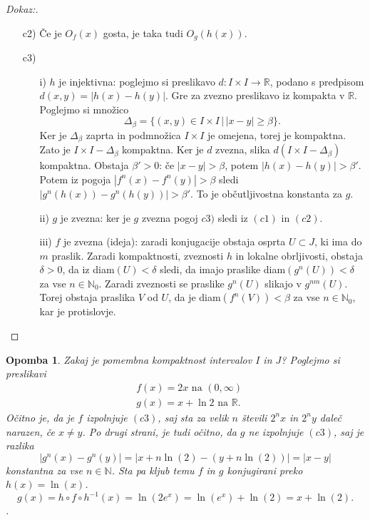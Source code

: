 \documentclass{article}
\newtheorem{opomba}{Opomba}
\newcommand{\N}{\mathbb{N}}
\newcommand{\R}{\mathbb{R}}
\begin{document}
\begin{proof}[Dokaz:]
\begin{enumerate}
\begin{center}
\begin{tikzpicture}
        \end{tikzpicture}
     \end{center}
\item[c2)] Če je $O_f(x)$ gosta, je taka tudi $O_g(h(x))$.
\item[c3)] 
\begin{enumerate}
    \item[i)] $h$ je injektivna: 
poglejmo si preslikavo $d: I\times I \rightarrow \R$, podano s predpisom $d(x, y) = |h(x) - h(y)|$. 
Gre za zvezno preslikavo iz kompakta v $\R$. Poglejmo si množico
$$
\Delta_\beta = \{(x, y)\in I\times I \,|\, |x-y| \geq \beta\}.
$$
Ker je $\Delta_\beta$ zaprta in podmnožica $I\times I$ je omejena, torej je kompaktna.
Zato je $I\times I - \Delta_\beta$ kompaktna. Ker je $d$ zvezna, slika $d(I\times I - \Delta_\beta)$
kompaktna. Obstaja $\beta' > 0$: če $|x - y|> \beta$, potem $|h(x) - h(y)| > \beta'$.
Potem iz pogoja $|f^n(x) - f^n(y)| > \beta$ sledi $|g^n(h(x)) - g^n(h(y))| > \beta'$. To je občutljivostna konstanta za $g$.
\item[ii)] $g$ je zvezna: ker je $g$ zvezna pogoj $c3)$ sledi iz $(c1)$ in $(c2)$.
\item[iii)] $f$ je zvezna (ideja): zaradi konjugacije obstaja osprta $U \subset J$, ki ima 
do $m$ praslik. Zaradi kompaktnosti, zveznosti $h$ in lokalne obrljivosti, obstaja 
$\delta > 0$, da iz diam$(U) < \delta$ sledi, da imajo praslike diam$(g^n(U)) < \delta$
za vse $n\in \N_0$. Zaradi zveznosti se praslike $g^n(U)$ slikajo v $g^{nm}(U)$. 
Torej obstaja praslika $V$ od $U$, da je diam$(f^n(V))< \beta$ za vse $n\in \N_0$, 
kar je protislovje. 
\end{enumerate}
\end{enumerate}
\end{proof}

\begin{opomba}
Zakaj je pomembna kompaktnost intervalov $I$ in $J$? Poglejmo si preslikavi 
\begin{align*}
&f(x) = 2x \text{ na } (0, \infty) \\ 
&g(x) = x + \ln 2 \text{ na } \R.
\end{align*}
Očitno je, da je $f$ izpolnjuje $(c3)$, saj sta za velik $n$ števili $2^n x$ in $2^n y$ daleč narazen, če $x\neq y$. Po drugi strani, je tudi očitno, da $g$ ne izpolnjuje $(c3)$, saj je razlika 
$$
|g^n(x) - g^n(y)| = |x + n\ln(2) - (y + n\ln(2))| = |x-y|
$$
konstantna za vse $n\in \N$. Sta pa kljub temu $f$ in $g$ konjugirani preko $h(x) = \ln(x)$.
$$
g(x) = h\circ f\circ h^{-1}(x) = \ln(2e^x) = \ln(e^x) + \ln(2) = x + \ln(2).
$$.
\end{opomba}
\end{document}
